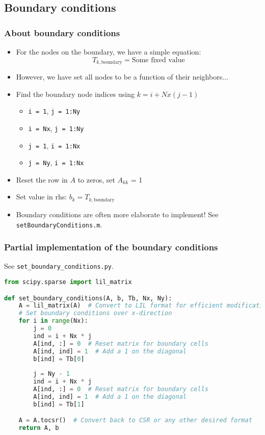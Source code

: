 \subsection*{Boundary conditions}
\begin{frame}[fragile]
  \frametitle{About boundary conditions}
  \begin{itemize}
    \item For the nodes on the boundary, we have a simple equation:
    \[
      T_{k,\text{boundary}} = \text{Some fixed value}
      \]
      \item However, we have set all nodes to be a function of their neighbors...
      \item Find the boundary node indices using $k = i + Nx(j-1)$
      \begin{itemize}
        \item \lstinline$i = 1$, \lstinline$j = 1:Ny$
        \item \lstinline$i = Nx$, \lstinline$j = 1:Ny$
        \item \lstinline$j = 1$, \lstinline$i = 1:Nx$
        \item \lstinline$j = Ny$, \lstinline$i = 1:Nx$
      \end{itemize}
      \item Reset the row in $A$ to zeros, set $A_{kk}$ = 1
      \item Set value in rhs: $b_k = T_{k,\text{boundary}}$
      \item Boundary conditions are often more elaborate to implement! See \lstinline$setBoundaryConditions.m$.
  \end{itemize}
\end{frame}
  
\begin{frame}[fragile]
  \frametitle{Partial implementation of the boundary conditions}
  See \lstinline$set_boundary_conditions.py$.
  \begin{lstlisting}[language=Python, basicstyle=\scriptsize]
from scipy.sparse import lil_matrix

def set_boundary_conditions(A, b, Tb, Nx, Ny):
    A = lil_matrix(A)  # Convert to LIL format for efficient modification
    # Set boundary conditions over x-direction
    for i in range(Nx):
        j = 0
        ind = i + Nx * j
        A[ind, :] = 0  # Reset matrix for boundary cells
        A[ind, ind] = 1  # Add a 1 on the diagonal
        b[ind] = Tb[0]
        
        j = Ny - 1
        ind = i + Nx * j
        A[ind, :] = 0  # Reset matrix for boundary cells
        A[ind, ind] = 1  # Add a 1 on the diagonal
        b[ind] = Tb[1]

    A = A.tocsr()  # Convert back to CSR or any other desired format
    return A, b
  \end{lstlisting}
\end{frame}

